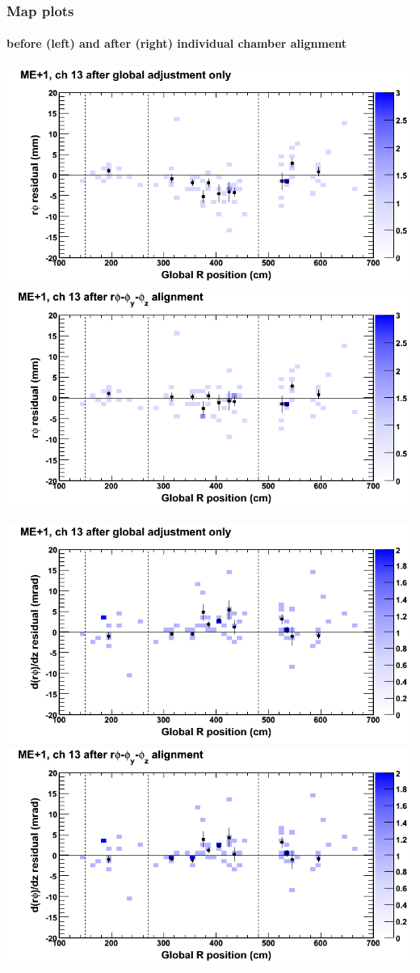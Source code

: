 \documentclass[compress]{beamer}
\begin{document}
\begin{frame}
\frametitle{Map plots}
\framesubtitle{before (left) and after (right) individual chamber alignment}
\includegraphics[width=0.5\linewidth]{ringmapplots_3dof/before_CSCvsr_mep1ch13_x.png} \includegraphics[width=0.5\linewidth]{ringmapplots_3dof/after_CSCvsr_mep1ch13_x.png}

\includegraphics[width=0.5\linewidth]{ringmapplots_3dof/before_CSCvsr_mep1ch13_dxdz.png} \includegraphics[width=0.5\linewidth]{ringmapplots_3dof/after_CSCvsr_mep1ch13_dxdz.png}
\end{frame}
\end{document}

